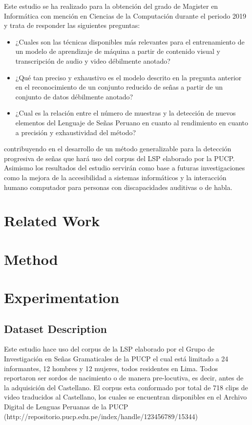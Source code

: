 \documentclass[twocolumn]{article}
\begin{document}
Este estudio se ha realizado para la obtención del grado de Magister en Informática con mención en Ciencias de la Computación durante el periodo 2019 y trata de responder las siguientes preguntas:
\begin{itemize}
\item ¿Cuales son las técnicas disponibles más relevantes para el entrenamiento de un modelo de aprendizaje de máquina a partir de contenido visual y transcripción de audio y video débilmente anotado?
\item ¿Qué tan preciso y exhaustivo es el modelo descrito en la pregunta anterior en el reconocimiento de un conjunto reducido de señas a partir de un conjunto de datos débilmente anotado?
\item ¿Cual es la relación entre el número de muestras y la detección de nuevos elementos del Lenguaje de Señas Peruano en cuanto al rendimiento en cuanto a precisión y exhaustividad del método?
\end{itemize}
contribuyendo en el desarrollo de un método generalizable para la detección progresiva de señas que hará uso del corpus del LSP elaborado por la PUCP. Asimismo los resultados del estudio servirán como base a futuras investigaciones como la mejora de la accesibilidad a sistemas informáticos y la interacción humano computador para personas con discapacidades auditivas o de habla.
\section{Related Work}
\section{Method}
\section{Experimentation}
\subsection{Dataset Description}
Este estudio hace uso del corpus de la LSP elaborado por el Grupo de Investigación en Señas Gramaticales de la PUCP el cual está limitado a 24 informantes, 12 hombres y 12 mujeres, todos residentes en Lima. Todos reportaron ser sordos de nacimiento o de manera pre-locutiva, es decir, antes de la adquisición del Castellano. El corpus esta conformado por total de 718 clips de video traducidos al Castellano, los cuales se encuentran disponibles en el Archivo Digital de Lenguas Peruanas de la PUCP (http://repositorio.pucp.edu.pe/index/handle/123456789/15344)
\end{document}
